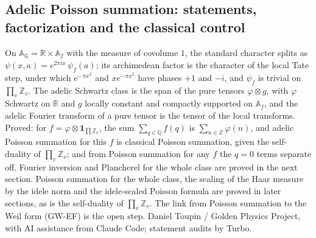 \documentclass{report}
\theoremstyle{definition}
\begin{document}
\begin{itemize}
\begin{itemize}
\section{Adelic Poisson summation: statements, factorization and the classical control}
On $\mathbb A_{\mathbb Q}=\mathbb R\times\mathbb A_f$ with the measure of covolume $1$, the standard character splits as $\psi(x,a)=e^{2\pi ix}\,\psi_f(a)$; its archimedean factor is the character of the local Tate step, under which $e^{-\pi x^2}$ and $xe^{-\pi x^2}$ have phases $+1$ and $-i$, and $\psi_f$ is trivial on $\prod_v\mathbb Z_v$. The adelic Schwartz class is the span of the pure tensors $\varphi\otimes g$, with $\varphi$ Schwartz on $\mathbb R$ and $g$ locally constant and compactly supported on $\mathbb A_f$, and the adelic Fourier transform of a pure tensor is the tensor of the local transforms. Proved: for $f=\varphi\otimes\mathbf 1_{\prod\mathbb Z_v}$, the sum $\sum_{q\in\mathbb Q}f(q)$ is $\sum_{n\in\mathbb Z}\varphi(n)$, and adelic Poisson summation for this $f$ is classical Poisson summation, given the self-duality of $\prod_v\mathbb Z_v$; and from Poisson summation for any $f$ the $q=0$ terms separate off. Fourier inversion and Plancherel for the whole class are proved in the next section. Poisson summation for the whole class, the scaling of the Haar measure by the idele norm and the idele-scaled Poisson formula are proved in later sections, as is the self-duality of $\prod_v\mathbb Z_v$. The link from Poisson summation to the Weil form (GW-EF) is the open step.
Daniel Toupin / Golden Physics Project, with AI assistance from Claude Code; statement audits by Turbo.


\end{itemize}
\end{itemize}
\end{document}
